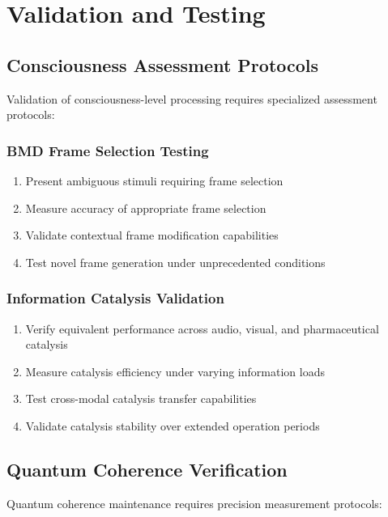 \documentclass[12pt,a4paper]{article}
\theoremstyle{remark}
\begin{document}
\section{Validation and Testing}

\subsection{Consciousness Assessment Protocols}

Validation of consciousness-level processing requires specialized assessment protocols:

\subsubsection{BMD Frame Selection Testing}

\begin{enumerate}
\item Present ambiguous stimuli requiring frame selection
\item Measure accuracy of appropriate frame selection
\item Validate contextual frame modification capabilities
\item Test novel frame generation under unprecedented conditions
\end{enumerate}

\subsubsection{Information Catalysis Validation}

\begin{enumerate}
\item Verify equivalent performance across audio, visual, and pharmaceutical catalysis
\item Measure catalysis efficiency under varying information loads
\item Test cross-modal catalysis transfer capabilities
\item Validate catalysis stability over extended operation periods
\end{enumerate}

\subsection{Quantum Coherence Verification}

Quantum coherence maintenance requires precision measurement protocols:
\end{document}
